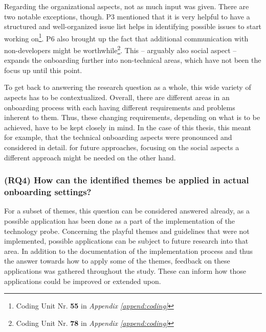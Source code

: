 Regarding the organizational aspects, not as much input was given. There are two notable exceptions, though. P3 mentioned that it is very helpful to have a structured and well-organized issue list helps in identifying possible issues to start working on\footnote{Coding Unit Nr. \textbf{55} in \textit{Appendix \ref{append:coding}}}. P6 also brought up the fact that additional communication with non-developers might be worthwhile\footnote{Coding Unit Nr. \textbf{78} in \textit{Appendix \ref{append:coding}}}. This -- arguably also social aspect -- expands the onboarding further into non-technical areas, which have not been the focus up until this point.

To get back to answering the research question as a whole, this wide variety of aspects has to be contextualized. Overall, there are different areas in an onboarding process with each having different requirements and problems inherent to them. Thus, these changing requirements, depending on what is to be achieved, have to be kept closely in mind. In the case of this thesis, this meant for example, that the technical onboarding aspects were pronounced and considered in detail. for future approaches, focusing on the social aspects a different approach might be needed on the other hand.

\subsubsection*{(RQ4) How can the identified themes be applied in actual onboarding settings?}

For a subset of themes, this question can be considered answered already, as a possible application has been done as a part of the implementation of the technology probe. Concerning the playful themes and guidelines that were not implemented, possible applications can be subject to future research into that area. In addition to the documentation of the implementation process and thus the answer towards how to apply some of the themes, feedback on these applications was gathered throughout the study. These can inform how those applications could be improved or extended upon.

